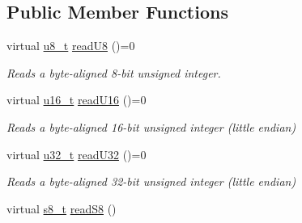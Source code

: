 \subsection*{Public Member Functions}
\begin{DoxyCompactItemize}
\item 
\hypertarget{classjswf_1_1io_1_1_generic_reader_a5ed096def8d74916ee47b7537842b4da}{virtual \hyperlink{namespacejswf_a3458b3040189121ea8ffc0bdfd3e32ee}{u8\+\_\+t} \hyperlink{classjswf_1_1io_1_1_generic_reader_a5ed096def8d74916ee47b7537842b4da}{read\+U8} ()=0}\label{classjswf_1_1io_1_1_generic_reader_a5ed096def8d74916ee47b7537842b4da}

\begin{DoxyCompactList}\small\item\em Reads a byte-\/aligned 8-\/bit unsigned integer. \end{DoxyCompactList}\item 
\hypertarget{classjswf_1_1io_1_1_generic_reader_a548b8e690f367ede657fa6227e49c6b9}{virtual \hyperlink{namespacejswf_a68db00e879e7d4a42c18e20dcea75292}{u16\+\_\+t} \hyperlink{classjswf_1_1io_1_1_generic_reader_a548b8e690f367ede657fa6227e49c6b9}{read\+U16} ()=0}\label{classjswf_1_1io_1_1_generic_reader_a548b8e690f367ede657fa6227e49c6b9}

\begin{DoxyCompactList}\small\item\em Reads a byte-\/aligned 16-\/bit unsigned integer (little endian) \end{DoxyCompactList}\item 
\hypertarget{classjswf_1_1io_1_1_generic_reader_a76a50b1e5706a02d044feff14cc3d16e}{virtual \hyperlink{namespacejswf_ae68dd480b6437e9a20db7b004283a466}{u32\+\_\+t} \hyperlink{classjswf_1_1io_1_1_generic_reader_a76a50b1e5706a02d044feff14cc3d16e}{read\+U32} ()=0}\label{classjswf_1_1io_1_1_generic_reader_a76a50b1e5706a02d044feff14cc3d16e}

\begin{DoxyCompactList}\small\item\em Reads a byte-\/aligned 32-\/bit unsigned integer (little endian) \end{DoxyCompactList}\item 
\hypertarget{classjswf_1_1io_1_1_generic_reader_a764f46418f5aff7ba3d79264d136479e}{virtual \hyperlink{namespacejswf_a75cd7aa1b422e7e8b2883bcececdc5a2}{s8\+\_\+t} \hyperlink{classjswf_1_1io_1_1_generic_reader_a764f46418f5aff7ba3d79264d136479e}{read\+S8} ()}\label{classjswf_1_1io_1_1_generic_reader_a764f46418f5aff7ba3d79264d136479e}


\end{DoxyCompactItemize}
